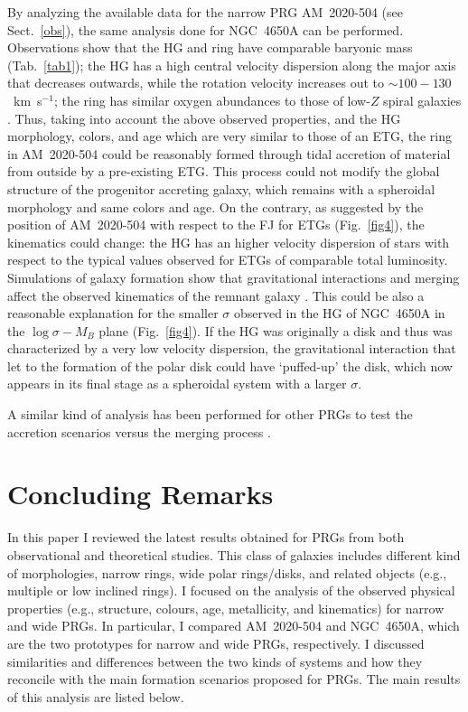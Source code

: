 \documentclass[11pt,twoside]{article}
\begin{document}
By analyzing the available data for the narrow PRG AM~2020-504 (see
Sect.~\ref{obs}), the same analysis done for NGC~4650A can be
performed. Observations show that the HG and ring have comparable
baryonic mass (Tab.~\ref{tab1}); the HG has a high central velocity
dispersion along the major axis that decreases outwards, while the
rotation velocity increases out to $\sim100-130$~km~s$^{-1}$; the ring
has similar oxygen abundances to those of low-$Z$ spiral
galaxies \citep[][see also Fig.~\ref{fig3}]{Freitas}. Thus, taking
into account the above observed properties, and the HG morphology,
colors, and age which are very similar to those of an ETG, the ring in
AM~2020-504 could be reasonably formed through tidal accretion of
material from outside by a pre-existing ETG. This process could not
modify the global structure of the progenitor accreting galaxy, which
remains with a spheroidal morphology and same colors and age. On the
contrary, as suggested by the position of AM~2020-504 with respect to
the FJ for ETGs (Fig.~\ref{fig4}), the kinematics could change: the HG
has an higher velocity dispersion of stars with respect to the typical
values observed for ETGs of comparable total luminosity. Simulations
of galaxy formation show that gravitational interactions and merging
affect the observed kinematics of the remnant
galaxy \citep[e.g.,][]{Bou05,Naab2006}. This could be also a
reasonable explanation for the smaller $\sigma$ observed in the HG of
NGC~4650A in the $\log\sigma-M_B$ plane (Fig.~\ref{fig4}). If the HG
was originally a disk \citep[as assumed by the cold accretion scenario
proposed by][]{Brook08} and thus was characterized by a very low
velocity dispersion, the gravitational interaction that let to the
formation of the polar disk could have `puffed-up' the disk, which now
appears in its final stage as a spheroidal system with a larger
$\sigma$.

A similar kind of analysis has been performed for other PRGs to test
the accretion scenarios versus the merging
process \citep[e.g.,][]{Resh2005, Spavone2011, Spavone2012, SI2013}.
 


\section{Concluding Remarks}

In this paper I reviewed the latest results obtained for PRGs from
both observational and theoretical studies. This class of galaxies
includes different kind of morphologies, narrow rings, wide polar
rings/disks, and related objects (e.g., multiple or low inclined
rings). I focused on the analysis of the observed physical properties
(e.g., structure, colours, age, metallicity, and kinematics) for
narrow and wide PRGs. In particular, I compared AM~2020-504 and
NGC~4650A, which are the two prototypes for narrow and wide PRGs,
respectively.  I discussed similarities and differences between the
two kinds of systems and how they reconcile with the main formation
scenarios proposed for PRGs. The main results of this analysis are
listed below.
\end{document}

